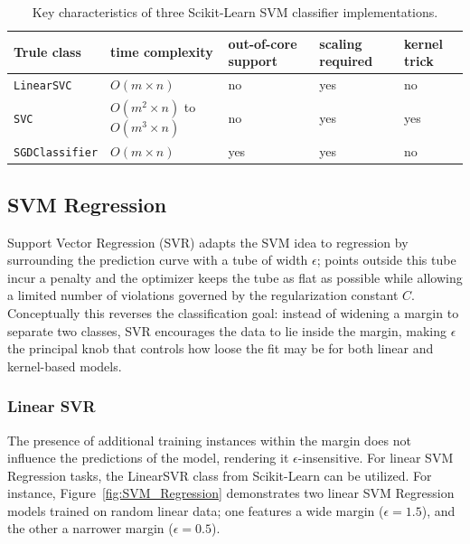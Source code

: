 \documentclass[12pt,letter]{article}
\begin{document}
\begin{table}[H]
\caption{Key characteristics of three Scikit-Learn SVM classifier implementations.}
\label{table:SVM_classifiers}
\begin{tabular}{@{}lllll@{}}
Trule
class & time complexity & out-of-core support & scaling required & kernel trick \\ \midrule
\texttt{LinearSVC} & $O(m \times n)$ & no & yes & no \\
\texttt{SVC} & $O(m^2 \times n)$ to $O(m^3 \times n)$ & no & yes & yes \\
\texttt{SGDClassifier} & $O(m \times n)$ & yes & yes & no \\ \bottomrule
\end{tabular}
\end{table}



\subsection{SVM Regression}
\label{sec:svr}

Support Vector Regression (SVR) adapts the SVM idea to regression by surrounding the prediction curve with a tube of width $\epsilon$; points outside this tube incur a penalty and the optimizer keeps the tube as flat as possible while allowing a limited number of violations governed by the regularization constant $C$.  Conceptually this reverses the classification goal: instead of widening a margin to separate two classes, SVR encourages the data to lie inside the margin, making $\epsilon$ the principal knob that controls how loose the fit may be for both linear and kernel-based models.





\subsubsection{Linear SVR}

The presence of additional training instances within the margin does not influence the predictions of the model, rendering it $\epsilon$-insensitive. For linear SVM Regression tasks, the LinearSVR class from Scikit-Learn can be utilized. For instance, 
Figure~\ref{fig:SVM_Regression} demonstrates two linear SVM Regression models trained on random linear data; one features a wide margin ($\epsilon = 1.5$), and the other a narrower margin ($\epsilon = 0.5$).
\end{document}
